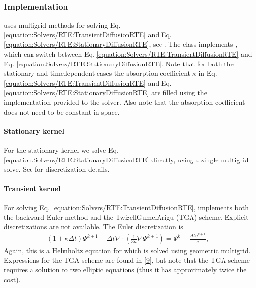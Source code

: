 \documentclass[letterpaper,10pt,english]{sphinxmanual}
\begin{document}
\subsubsection{Implementation}
\label{\detokenize{Solvers/RTE:implementation}}
 uses multigrid methods for solving Eq. \ref{equation:Solvers/RTE:TransientDiffusionRTE} and Eq. \ref{equation:Solvers/RTE:StationaryDiffusionRTE}, see {\hyperref[\detokenize{Source/LinearSolvers:chap-linearsolvers}]{}}.
The class implements , which can switch between Eq. \ref{equation:Solvers/RTE:TransientDiffusionRTE} and Eq. \ref{equation:Solvers/RTE:StationaryDiffusionRTE}.
Note that for both the stationary and time\sphinxhyphen{}dependent cases the absorption coefficient \(\kappa\) in Eq. \ref{equation:Solvers/RTE:TransientDiffusionRTE} and Eq. \ref{equation:Solvers/RTE:StationaryDiffusionRTE} are filled using the  implementation provided to the solver.
Also note that the absorption coefficient does not need to be constant in space.


\paragraph{Stationary kernel}
\label{\detokenize{Solvers/RTE:stationary-kernel}}
For the stationary kernel we solve Eq. \ref{equation:Solvers/RTE:StationaryDiffusionRTE} directly, using a single multigrid solve.
See {\hyperref[\detokenize{Source/LinearSolvers:chap-linearsolvers}]{}} for discretization details.


\paragraph{Transient kernel}
\label{\detokenize{Solvers/RTE:transient-kernel}}
For solving Eq. \ref{equation:Solvers/RTE:TransientDiffusionRTE},  implements both the backward Euler method and the Twizell\sphinxhyphen{}Gumel\sphinxhyphen{}Arigu (TGA) scheme.
Explicit discretizations are not available.
The Euler discretization is
\begin{equation*}
\begin{split}\left(1+ \kappa \Delta t\right)\Psi^{k+1} - \Delta t \nabla\cdot\left(\frac{1}{3\kappa}\nabla\Psi^{k+1}\right) = \Psi^{k} + \frac{\Delta t\eta^{k+1}}{c},\end{split}
\end{equation*}
Again, this is a Helmholtz equation for  which is solved using geometric multigrid.
Expressions for the TGA scheme are found in {[}\hyperlink{cite.ZZReferences:id34}{9}{]}, but note that the TGA scheme requires a solution to two elliptic equations (thus it has approximately twice the cost).
\end{document}
